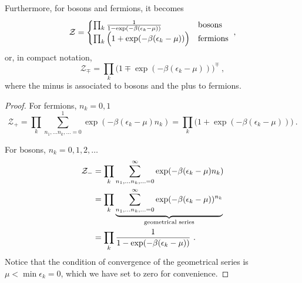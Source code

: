     Furthermore, for bosons and fermions, it becomes
    \begin{equation*}
        \mathcal Z = \begin{cases}
            \prod_k \frac{1}{1 - \exp (- \beta (\epsilon_k - \mu))} & \textnormal{bosons} \\
            \prod_k \Big (1 + \exp (- \beta (\epsilon_k - \mu)) \Big ) & \textnormal{fermions} \\
        \end{cases} ~,
    \end{equation*}
    or, in compact notation, 
    \begin{equation*}
        \mathcal Z_\mp = \prod_k \Big ( 1 \mp \exp(- \beta (\epsilon_k - \mu) ) \Big)^\mp ~,
    \end{equation*}
    where the minus is associated to bosons and the plus to fermions.
    \begin{proof}
        For fermions, $n_k = 0, 1$
        \begin{equation*}
            \mathcal Z_+ = \prod_k \sum_{n_1, \ldots n_k, \ldots = 0}^1 \exp(-\beta(\epsilon_k - \mu)n_k) = \prod_k \Big (1 + \exp (- \beta (\epsilon_k - \mu)) \Big ) ~.
        \end{equation*}

        For bosons, $n_k = 0, 1, 2, \ldots$
        \begin{equation*}
        \begin{aligned}
            \mathcal Z_- & = \prod_k \sum_{n_1, \ldots n_k, \ldots = 0}^\infty \exp(-\beta(\epsilon_k - \mu)n_k) \\ & = \prod_k \underbrace{\sum_{n_1, \ldots n_k, \ldots = 0}^\infty \exp(-\beta(\epsilon_k - \mu))^{n_k}}_{\textnormal{geometrical series}} \\ & = \prod_k \frac{1}{1 - \exp (- \beta (\epsilon_k - \mu))} ~.
        \end{aligned}
        \end{equation*}
        Notice that the condition of convergence of the geometrical series is $\mu < \min \epsilon_k = 0$, which we have set to zero for convenience.
    \end{proof}

